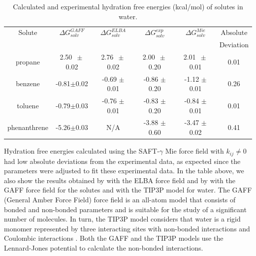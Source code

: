 \begin{table}[H]
	\centering
	\caption{Calculated and experimental hydration free energies  (kcal/mol) of solutes in water.}
	\label{tbl:solv2}
	\begin{tabular}{cccccc}
		\hline\hline
		Solute       & $\Delta G_{solv}^{GAFF}$ & $\Delta G_{solv}^{ELBA}$ & $\Delta G_{solv}^{exp}$ & $\Delta G_{solv}^{Mie}$ & Absolute  \\
		&                          &                          &                         &                         & Deviation \\ \hline\hline
		propane      & 2.50 $\, \pm$0.02           & 2.76 $\, \pm$ 0.02          & 2.00 $\, \pm$ 0.20         & 2.01 $ \, \pm$ 0.01         & 0.01      \\
		benzene      & -0.81$\pm$0.02           & -0.69 $\pm$ 0.01         & -0.86 $\pm$ 0.20        & -1.12 $\pm$ 0.01        & 0.26      \\
		toluene      & -0.79$\pm$0.03           & -0.76 $\pm$ 0.01         & -0.83 $\pm$ 0.20        & -0.84 $\pm$ 0.01        & 0.01      \\
		phenanthrene & -5.26$\pm$0.03           & N/A                        & -3.88 $\pm$ 0.60        & -3.47 $\pm$ 0.02        & 0.41      \\ \hline\hline
	\end{tabular}
	
\end{table}

Hydration free energies calculated using the SAFT-$\gamma$ Mie force field with $k_{ij} \neq 0$ had low absolute deviations from the experimental data, as expected since the parameters were adjusted to fit these experimental data. In the table above, we also show the results obtained by  with the ELBA force field and by  with the GAFF force field for the solutes and with the TIP3P model for water. The GAFF (General Amber Force Field) force field is an all-atom model that consists of bonded and non-bonded parameters and is suitable for the study of a significant number of molecules. In turn, the TIP3P model considers that water is a rigid monomer represented by three interacting sites with non-bonded interactions and Coulombic interactions \cite{doi:10.1063/1.445869}. Both the GAFF and the TIP3P models use the Lennard-Jones potential to calculate the non-bonded interactions.

